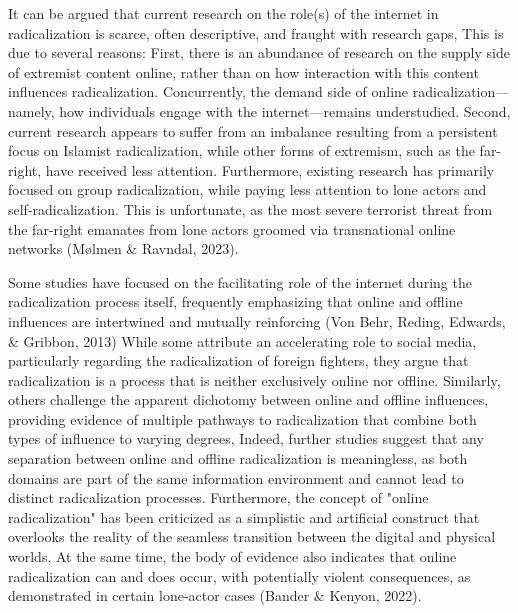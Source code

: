 \documentclass[10pt]{NSP1}
\begin{document}
It can be argued that current research on the role(s) of the internet in radicalization is scarce, often descriptive, and fraught with research gaps, This is due to several reasons: First, there is an abundance of research on the supply side of extremist content online, rather than on how interaction with this content influences radicalization. Concurrently, the demand side of online radicalization—namely, how individuals engage with the internet—remains understudied. Second, current research appears to suffer from an imbalance resulting from a persistent focus on Islamist radicalization, while other forms of extremism, such as the far-right, have received less attention. Furthermore, existing research has primarily focused on group radicalization, while paying less attention to lone actors and self-radicalization. This is unfortunate, as the most severe terrorist threat from the far-right emanates from lone actors groomed via transnational online networks (Mølmen \& Ravndal, 2023).

Some studies have focused on the facilitating role of the internet during the radicalization process itself, frequently emphasizing that online and offline influences are intertwined and mutually reinforcing (Von Behr, Reding, Edwards, \& Gribbon, 2013) While some attribute an accelerating role to social media, particularly regarding the radicalization of foreign fighters, they argue that radicalization is a process that is neither exclusively online nor offline. Similarly, others challenge the apparent dichotomy between online and offline influences, providing evidence of multiple pathways to radicalization that combine both types of influence to varying degrees, Indeed, further studies suggest that any separation between online and offline radicalization is meaningless, as both domains are part of the same information environment and cannot lead to distinct radicalization processes. Furthermore, the concept of "online radicalization" has been criticized as a simplistic and artificial construct that overlooks the reality of the seamless transition between the digital and physical worlds, At the same time, the body of evidence also indicates that online radicalization can and does occur, with potentially violent consequences, as demonstrated in certain lone-actor cases (Bander \& Kenyon, 2022).
\end{document}
